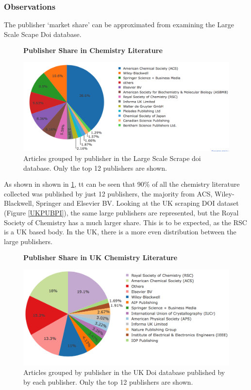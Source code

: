 \subsubsection{Observations}
\label{sec:CORPUSOBSERVATIONS}
The publisher `market share' can be approximated from examining the Large Scale Scape Doi database.
\begin{figure}[H]
    \centering
    \textbf{Publisher Share in Chemistry Literature}\par\medskip
    \includegraphics[width=\textwidth]{Data_Acquisition/publishers_pie.png}
    \caption{Articles grouped by publisher in the Large Scale Scrape doi database. Only the top 12 publishers are shown.}
     \label{fig:PUBPI}
\end{figure}
As shown in  shown in \ref{fig:PUBPI}, tt can be seen that 90\% of all the chemistry literature collected was published by just 12 publishers, the majority from ACS, Wiley-Blackwell, Springer and Elsevier BV. Looking at the UK scraping DOI dataset (Figure \ref{UKPUBPI}), the same large publishers are represented, but the Royal Society of Chemistry has a much larger share. This is to be expected, as the RSC is a UK based body. In the UK, there is a more even distribution between the large publishers. 

\begin{figure}[H]
    \centering
    \textbf{Publisher Share in UK Chemistry Literature}\par\medskip
    \includegraphics[width=\textwidth]{Data_Acquisition/uk_publishers_pie.png}
    \caption{Articles grouped by publisher in the UK Doi database published by by each publisher. Only the top 12 publishers are shown.}
     \label{fig:UKPUBPI}
\end{figure}


